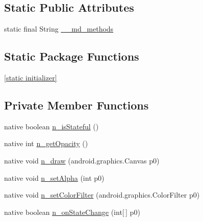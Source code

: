 \subsection*{Static Public Attributes}
\begin{CompactItemize}
\item 
static final String \hyperlink{classmd5b60ffeb829f638581ab2bb9b1a7f4f3f_1_1_frame_renderer___frame_drawable_cfbbaabd3b64c552efa12d5d5b5d7e8b}{\_\-\_\-md\_\-methods}
\end{CompactItemize}
\subsection*{Static Package Functions}
\begin{CompactItemize}
\item 
\hyperlink{classmd5b60ffeb829f638581ab2bb9b1a7f4f3f_1_1_frame_renderer___frame_drawable_d75481554fbea368094981b7051aa07b}{\mbox{[}static initializer\mbox{]}}
\end{CompactItemize}
\subsection*{Private Member Functions}
\begin{CompactItemize}
\item 
native boolean \hyperlink{classmd5b60ffeb829f638581ab2bb9b1a7f4f3f_1_1_frame_renderer___frame_drawable_fa40caf99425490405ec90556304af17}{n\_\-isStateful} ()
\item 
native int \hyperlink{classmd5b60ffeb829f638581ab2bb9b1a7f4f3f_1_1_frame_renderer___frame_drawable_6ded555eac288e334acbceab35ef7b5d}{n\_\-getOpacity} ()
\item 
native void \hyperlink{classmd5b60ffeb829f638581ab2bb9b1a7f4f3f_1_1_frame_renderer___frame_drawable_b47dfea8aa6042fe07f335c7bcfa6807}{n\_\-draw} (android.graphics.Canvas p0)
\item 
native void \hyperlink{classmd5b60ffeb829f638581ab2bb9b1a7f4f3f_1_1_frame_renderer___frame_drawable_7c043666fbe2cd061179bcb3660fd0cc}{n\_\-setAlpha} (int p0)
\item 
native void \hyperlink{classmd5b60ffeb829f638581ab2bb9b1a7f4f3f_1_1_frame_renderer___frame_drawable_b7bf917ac36adc14fbf1b7b2bd2de0dc}{n\_\-setColorFilter} (android.graphics.ColorFilter p0)
\item 
native boolean \hyperlink{classmd5b60ffeb829f638581ab2bb9b1a7f4f3f_1_1_frame_renderer___frame_drawable_f1d15dd26004a6e67f7ebf00c4c613f8}{n\_\-onStateChange} (int\mbox{[}$\,$\mbox{]} p0)
\end{CompactItemize}
